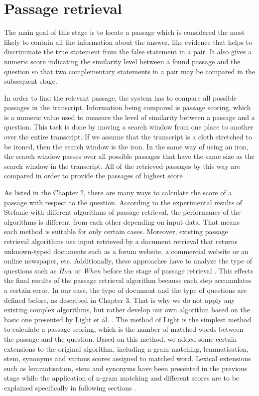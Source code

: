 \section{Passage retrieval} 


The main goal of this stage is to locate a passage which is considered the most likely to contain all the information about the answer, like evidence that helps to discriminate the true statement from the false statement in a pair. It also gives a numeric score indicating the similarity level between a found passage and the question so that two complementary statements in a pair may be compared in the subsequent stage.

In order to find the relevant passage, the system has to compare all possible passages in the transcript. Information being compared is passage scoring, which is a numeric value used to measure the level of similarity between a passage and a question. This task is done by moving a search window from one place to another over the entire transcript. If we assume that the transcript is a cloth stretched to be ironed, then the search window is the iron. In the same way of using an iron, the search window passes over all possible passages that have the same size as the search window in the transcript. All of the retrieved passages by this way are compared in order to provide the passages of highest score \cite{lequocanh, lequocanh1}. 

As listed in the Chapter 2, there are many ways to calculate the score of a passage with respect to the question. According to the experimental results of Stefanie \cite{tellex2003qep} with different algorithms of passage retrieval, the performance of the algorithms is different from each other depending on input data. That means each method is suitable for only certain cases. Moreover, existing passage retrieval algorithms use input retrieved by a document retrieval that returns unknown-typed documents such as a forum website, a commercial website or an online newspaper, etc. Additionally, these approaches have to analyze the type of questions such as \textit{How} or \textit{When} before the stage of passage retrieval  \cite{TREC8, TREC2001, hirschman2002nlq, tellex2003qep}. This effects the final results of the passage retrieval algorithm because each step accumulates a certain error. In our case, the type of document and the type of questions are defined before, as described in Chapter 3. That is why we do not apply any existing complex algorithms, but rather develop our own algorithm based on the basic one presented by Light et al. \cite{light2002aec}. The method of Light is the simplest method to calculate a passage scoring, which is the number of matched words between the passage and the question. Based on this method, we added some certain extensions to the original algorithm, including n-gram matching, lemmatisation, stem, synonyms and various scores assigned to matched word. Lexical extensions such as lemmatisation, stem and synonyms have been presented in the previous stage while the application of n-gram matching and different scores are to be explained specifically in following sections \cite{lequocanh1}.

